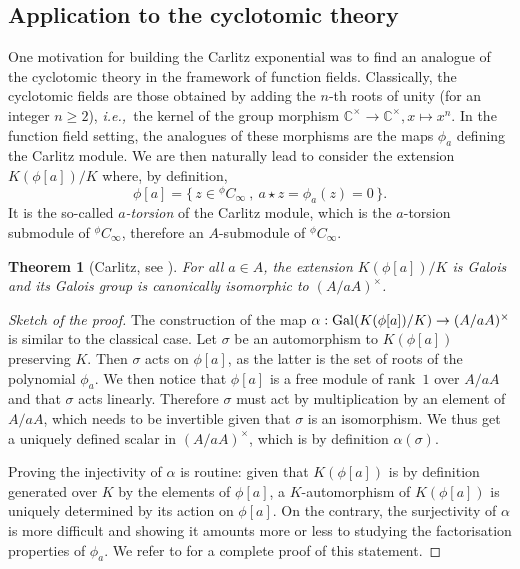 \documentclass[11pt]{article}
\newtheorem{theorem}{Theorem}[section]
\theoremstyle{definition}
\renewcommand\geq{\geqslant}
\newcommand\C{\mathbb{C}}
\newcommand{\Cinf}{C_{\infty}}
\newcommand{\Gal}{\text{\rm Gal}}
\newcommand{\phiact}[1]{{}^\phi\! #1}
\newcommand{\ie}{\textit{i.e.,~}}
\begin{document}
\subsection{Application to the cyclotomic theory}
\label{applications_cyclotomic_theory}

One motivation for building the Carlitz exponential
was to find an analogue of the cyclotomic theory in the framework of
function fields. Classically, the cyclotomic fields are those obtained
by adding the $n$-th roots of unity (for an integer $n\geq2$), \ie the kernel of the 
group morphism $\C^\times \to \C^\times, x \mapsto x^n$.
In the function field setting, the analogues of these morphisms are the maps $\phi_a$ defining the Carlitz module.
We are then naturally lead to consider the extension $K(\phi[a])/K$ where, by definition,
$$\phi[a] = \big\{\,z \in \phiact\Cinf \ , \
a \star z = \phi_a(z) = 0\,\big\}.$$
It is the so-called \emph{$a$-torsion} of the Carlitz module, which is the $a$-torsion submodule of $\phiact\Cinf$, therefore an $A$-submodule of $\phiact\Cinf$.

\begin{theorem}[{Carlitz, see \cite[Proposition~12.5]{Rosen_2002}}]
For all $a \in A$, 
the extension $K(\phi[a])/K$ is Galois and its Galois group
is canonically isomorphic to $(A/aA)^\times$.
\end{theorem}

\begin{proof}[Sketch of the proof]
The construction of the map $\alpha : \Gal(K(\phi[a])/K) \to 
(A/aA)^\times$ is similar to the classical case. Let $\sigma$
be an automorphism to $K(\phi[a])$ preserving $K$.
Then $\sigma$ acts on $\phi[a]$, as the latter is the set of
roots of the polynomial $\phi_a$. We then notice that $\phi[a]$
is a free module of rank~$1$ over $A/aA$ and that $\sigma$ acts
linearly. Therefore $\sigma$ must act by multiplication by an element of $A/aA$, which needs to be invertible given that $\sigma$
is an isomorphism. We thus get a uniquely defined scalar in
$(A/aA)^\times$, which is by definition $\alpha(\sigma)$.

Proving the injectivity of $\alpha$ is routine: given that 
$K(\phi[a])$ is by definition generated over $K$ by the elements
of $\phi[a]$, a $K$-automorphism of $K(\phi[a])$ is uniquely
determined by its action on $\phi[a]$. On the contrary, the
surjectivity of $\alpha$ is more difficult and showing it amounts
more or less to studying the factorisation properties of $\phi_a$.
We refer to \cite[Theorem~12.8]{Rosen_2002} for a complete proof of this statement.
\end{proof}
\end{document}
